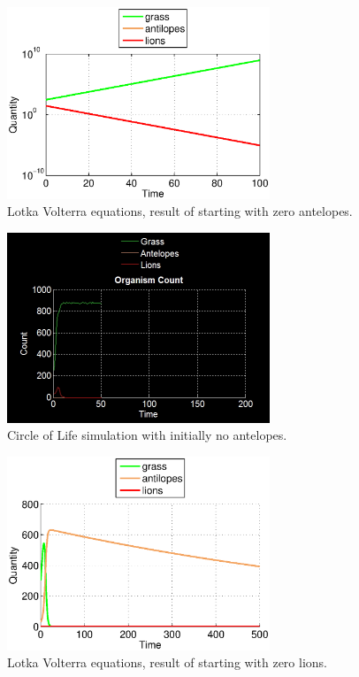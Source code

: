 \documentclass[11pt]{article}
\begin{document}
\begin{figure}
\centering
\includegraphics[width=0.7\textwidth]{LotkaVolterraNoAntelopes.eps}
\caption{Lotka Volterra equations, result of starting with zero antelopes.}
\label{fig:removeAllAntelopes}
\end{figure}

\begin{figure}
\centering
\includegraphics[width=0.7\textwidth]{noAntelopesOnlyCount.png}
\caption{Circle of Life simulation with initially no antelopes.}
\label{fig:noAntelopes}
\end{figure}

\begin{figure}
\centering
\includegraphics[width=0.7\textwidth]{LotkaVolterraNoLions.eps}
\caption{Lotka Volterra equations, result of starting with zero lions.}
\label{fig:removeAllLions}
\end{figure}
\end{document}
